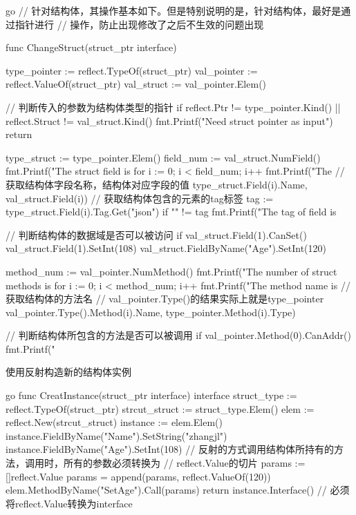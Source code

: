 \begin{outline}[enumerate]
\begin{code-in-enumerate}{go}
// 针对结构体，其操作基本如下。但是特别说明的是，针对结构体，最好是通过指针进行
// 操作，防止出现修改了之后不生效的问题出现

func ChangeStruct(struct_ptr interface{}) {
    type_pointer := reflect.TypeOf(struct_ptr)
    val_pointer := reflect.ValueOf(struct_ptr)
    val_struct := val_pointer.Elem()

    // 判断传入的参数为结构体类型的指针
    if reflect.Ptr != type_pointer.Kind() || reflect.Struct != val_struct.Kind() {
        fmt.Printf("Need struct pointer as input\n")
        return
    }

    type_struct := type_pointer.Elem()
    field_num := val_struct.NumField()
    fmt.Printf("The struct field is %
    for i := 0; i < field_num; i++ {
        fmt.Printf("The %
            // 获取结构体字段名称，结构体对应字段的值
            type_struct.Field(i).Name, val_struct.Field(i))
        // 获取结构体包含的元素的tag标签
        tag := type_struct.Field(i).Tag.Get("json")
        if "" != tag {
            fmt.Printf("The tag of field is %
        }
    }

    // 判断结构体的数据域是否可以被访问
    if val_struct.Field(1).CanSet() {
        val_struct.Field(1).SetInt(108)
        val_struct.FieldByName("Age").SetInt(120)
    }

    method_num := val_pointer.NumMethod()
    fmt.Printf("The number of struct methods is %
    for i := 0; i < method_num; i++ {
        fmt.Printf("The method name is %
            // 获取结构体的方法名
            // val_pointer.Type()的结果实际上就是type_pointer
            val_pointer.Type().Method(i).Name,
            type_pointer.Method(i).Type)
    }

    // 判断结构体所包含的方法是否可以被调用
    if val_pointer.Method(0).CanAddr() {
        fmt.Printf("%
    }
}
\end{code-in-enumerate}

  \1 使用反射构造新的结构体实例

\begin{code-in-enumerate}{go}
func CreatInstance(struct_ptr interface{}) interface{} {
    struct_type := reflect.TypeOf(struct_ptr)
    strcut_struct := struct_type.Elem()
    elem := reflect.New(strcut_struct)
    instance := elem.Elem()
    instance.FieldByName("Name").SetString("zhangjl")
    instance.FieldByName("Age").SetInt(108)
    // 反射的方式调用结构体所持有的方法，调用时，所有的参数必须转换为
    // reflect.Value的切片
    params := []reflect.Value{}
    params = append(params, reflect.ValueOf(120))
    elem.MethodByName("SetAge").Call(params)
    return instance.Interface() // 必须将reflect.Value转换为interface
}


\end{code-in-enumerate}
\end{outline}
